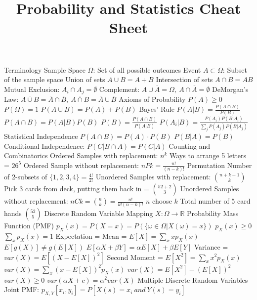 \documentclass[14pt]{extarticle}
\title{Probability and Statistics Cheat Sheet}
\begin{document}
	\maketitle
	\begin{outline}	
		\1	Terminology
			\2	Sample Space $\Omega$: Set of all possible outcomes
			\2	Event $A \subset \Omega$:	Subset of the sample space
			\2	Union of sets $A \cup B = A + B$
			\2	Intersection of sets $A \cap B = AB$
			\2	Mutual Exclusion: $A_i \cap A_j = \emptyset$ 
			\2	Complement:	$A \cup \overline{A} = \Omega,~A\cap\overline{A} = \emptyset$
			\2	DeMorgan's Law:		$\overline{A \cup B}	 = \overline{A} \cap \overline{B},~\overline{A \cap B} = \overline{A} \cup \overline{B}$
		\1	Axioms of Probability
			\2	$P(A) \ge 0$
			\2	$P(\Omega) = 1$
			\2	$P(A \cup B) = P(A) + P(B)$
		\1	Bayes' Rule
			\2	$P(A | B) = \frac{P(A \cap B)}{P(B)}$
			\2	$P(A \cap B) = P(A | B) P(B)$
			\2	$P(B) = \frac{P(A \cap B)}{P(A | B)}$
			\2	$P(A_i|B) = \frac{P(A_i)P(B|A_i)}{\sum_j P(A_j)P(B | A_j)}$
		\1	Statistical Independence
			\2	$P(A \cap B) = P(A) \cdot P(B)$
			\2	$P(B | A) = P(B)$
			\2	Conditional Independence:	$P(C | B \cap A) = P(C | A)$
		\1	Counting and Combinatorics
			\2	Ordered Samples with replacement: $n^k$
				\3 Ways to arrange 5 letters = $26^5$
			\2	Ordered Sample without replacement: $nPk = \frac{n!}{(n-k)!}$
				\3	Permutation
				\3	Number of 2-subsets of $\{1,2,3,4\} = \frac{4!}{2!}$
			\2	Unordered Samples with replacement: $\binom{n+k-1}{k}$
				\3	Pick 3 cards from deck, putting them back in = $\binom{52 + 2}{3}$
			\2	Unordered Samples without replacement: $nCk = \binom{n}{k} = \frac{n!}{k!(n-k)!}$
				\3	$n$ choose $k$
				\3	Total number of 5 card hands $\binom{52}{5}$
		\1	Discrete Random Variable
			\2	Mapping $X : \Omega \rightarrow \mathbb{R}$
			\2	Probability Mass Function (PMF) $p_X(x) = P(X = x) = P(\{\omega \in \Omega | X(\omega) = x\})$
				\3	$p_X(x) \ge 0$
				\3	$\sum_x p_X(x) = 1$
			\2	Expectation = Mean = $E[X] = \sum_x x p_X(x)$
				\3	$E[g(X)] \neq g(E[X])$
				\3	$E[\alpha X + \beta Y] = \alpha E[X] + \beta E[Y]$
			\2	Variance = $var(X) = E[(X - E[X])^2]$
				\3	Second Moment = $E[X^2] = \sum_x x^2 p_X(x)$
				\3	$var(X) = \sum_x (x - E[X])^2 p_X(x)$
				\3	$var(X) = E[X^2] - (E[X])^2$
				\3	$var(X) \ge 0$
				\3	$var(\alpha X + c) = \alpha^2 var(X)$
		\1	Multiple Discrete Random Variables
			\2	Joint PMF:	$p_{X,Y}[x_i,y_i] = P[X(s) = x_i~and~Y(s) = y_i]$

\end{outline}
\end{document}
